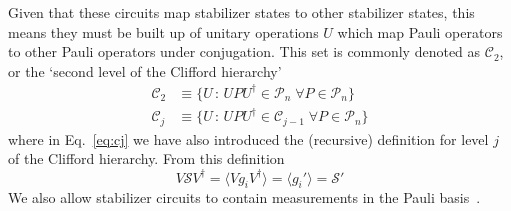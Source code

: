 Given that these circuits map stabilizer states to other stabilizer states, this means they must be built up of unitary operations $U$ which map Pauli operators to other Pauli operators under conjugation. This set is commonly denoted as $\mathcal{C}_{2}$, or the `second level of the Clifford hierarchy' 
\begin{align}
    \mathcal{C}_{2} &\equiv \{U\,:\,UPU^{\dagger}\in\mathcal{P}_{n}\;\forall P\in\mathcal{P}_{n}\} \label{eq:c2}\\
    \mathcal{C}_{j} &\equiv \{U\,:\,UPU^{\dagger}\in\mathcal{C}_{j-1}\;\forall P\in\mathcal{P}_{n}\} \label{eq:cj}
\end{align}
where in Eq.~\ref{eq:cj} we have also introduced the (recursive) definition for level $j$ of the Clifford hierarchy. From this definition
\begin{equation}
    V\mathcal{S}V^{\dagger}=\langle Vg_{i}V^{\dagger}\rangle = \langle g_{i}' \rangle = \mathcal{S}'
\end{equation}
We also allow stabilizer circuits to contain measurements in the Pauli basis~\cite{Gottesman1998b}.
